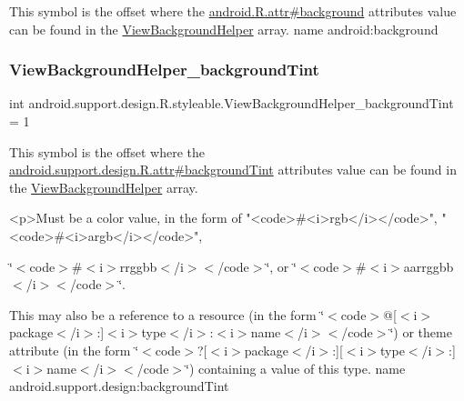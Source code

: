 This symbol is the offset where the \hyperlink{}{android.\+R.\+attr\#background} attribute\textquotesingle{}s value can be found in the \hyperlink{classandroid_1_1support_1_1design_1_1R_1_1styleable_a7df8d9542168fb1f80021c7e5b776ddb}{View\+Background\+Helper} array.  name android\+:background \mbox{\label{classandroid_1_1support_1_1design_1_1R_1_1styleable_a2e9994ef36fe7a2256990b68a1a32e6b}} 
\subsubsection{\texorpdfstring{View\+Background\+Helper\+\_\+background\+Tint}{ViewBackgroundHelper\_backgroundTint}}
{\footnotesize\ttfamily int android.\+support.\+design.\+R.\+styleable.\+View\+Background\+Helper\+\_\+background\+Tint = 1\hspace{0.3cm}{\ttfamily [static]}}

This symbol is the offset where the \hyperlink{classandroid_1_1support_1_1design_1_1R_1_1attr_ad5222449c1177317bb4170da3621846d}{android.\+support.\+design.\+R.\+attr\#background\+Tint} attribute\textquotesingle{}s value can be found in the \hyperlink{classandroid_1_1support_1_1design_1_1R_1_1styleable_a7df8d9542168fb1f80021c7e5b776ddb}{View\+Background\+Helper} array.

\begin{DoxyVerb}      <p>Must be a color value, in the form of "<code>#<i>rgb</i></code>", "<code>#<i>argb</i></code>",
\end{DoxyVerb}
 \char`\"{}$<$code$>$\#$<$i$>$rrggbb$<$/i$>$$<$/code$>$\char`\"{}, or \char`\"{}$<$code$>$\#$<$i$>$aarrggbb$<$/i$>$$<$/code$>$\char`\"{}. 

This may also be a reference to a resource (in the form \char`\"{}$<$code$>$@\mbox{[}$<$i$>$package$<$/i$>$\+:\mbox{]}$<$i$>$type$<$/i$>$\+:$<$i$>$name$<$/i$>$$<$/code$>$\char`\"{}) or theme attribute (in the form \char`\"{}$<$code$>$?\mbox{[}$<$i$>$package$<$/i$>$\+:\mbox{]}\mbox{[}$<$i$>$type$<$/i$>$\+:\mbox{]}$<$i$>$name$<$/i$>$$<$/code$>$\char`\"{}) containing a value of this type.  name android.\+support.\+design\+:background\+Tint \mbox{\label{classandroid_1_1support_1_1design_1_1R_1_1styleable_ad51f84023757d5598448db4232fbad8c}} 
